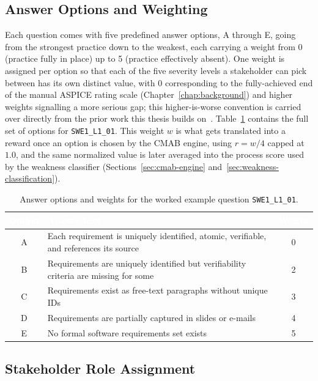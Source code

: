 \documentclass[a4paper, 12pt, oneside, openany, BCOR1cm,toc=chapterentrywithdots]{scrbook}
\newcommand{\thw}[1]{\textcolor{white}{\textbf{#1}}}
\begin{document}
\subsection{Answer Options and Weighting}
\label{sec:answer-weighting}

Each question comes with five predefined answer options, A through E, going from the strongest
practice down to the weakest, each carrying a weight from 0 (practice fully in place) up to 5
(practice effectively absent). One weight is assigned per option so that each of the five
severity levels a stakeholder can pick between has its own distinct value, with 0 corresponding
to the fully-achieved end of the manual ASPICE rating scale (Chapter~\ref{chap:background}) and
higher weights signalling a more serious gap; this higher-is-worse convention is carried over
directly from the prior work this thesis builds on~\cite{datsogiannis2024early}. Table~\ref{tab:example-question}
contains the full set of options for \texttt{SWE1\_L1\_01}. This weight $w$ is what gets
translated into a reward once an option is chosen by the CMAB engine, using $r = w / 4$ capped at
$1.0$, and the same normalized value is later averaged into the process score used by the
weakness classifier (Sections~\ref{sec:cmab-engine} and~\ref{sec:weakness-classification}).

\begin{table}[h]
\centering
{}
\begin{tabular}{c p{8.5cm} c}
\toprule
\rowcolor{green!55!black}
\thw{Option} & \thw{Answer text} & \thw{Weight} \\
\midrule
A & Each requirement is uniquely identified, atomic, verifiable, and references its source & 0 \\
B & Requirements are uniquely identified but verifiability criteria are missing for some & 2 \\
C & Requirements exist as free-text paragraphs without unique IDs & 3 \\
D & Requirements are partially captured in slides or e-mails & 4 \\
E & No formal software requirements set exists & 5 \\
\bottomrule
\end{tabular}
\caption{Answer options and weights for the worked example question \texttt{SWE1\_L1\_01}.}
\label{tab:example-question}
\end{table}

\subsection{Stakeholder Role Assignment}
\end{document}
